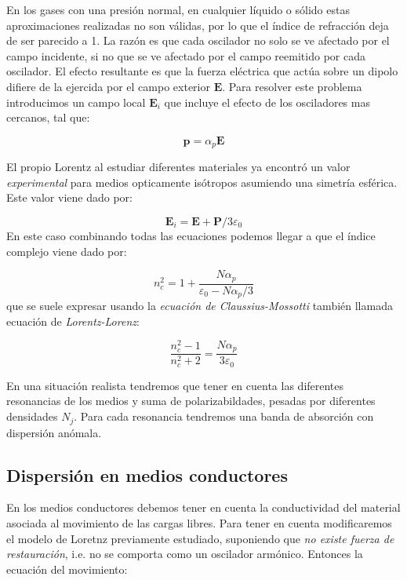 \documentclass[12pt]{article}
\newcommand{\En}{\mathbf{E}}
\newcommand{\Pn}{\mathbf{P}}
\newcommand{\pn}{\mathbf{p}}
\numberwithin{equation}{section}
\numberwithin{figure}{section}
\begin{document}
En los gases con una presión normal, en cualquier líquido o sólido estas aproximaciones realizadas no son válidas, por lo que el índice de refracción deja de ser parecido a 1. La razón es que cada oscilador no solo se ve afectado por el campo incidente, si no que se ve afectado por el campo reemitido por cada oscilador. El efecto resultante es que la fuerza eléctrica que actúa sobre un dipolo difiere de la ejercida por el campo exterior $\En$. Para resolver este problema introducimos un campo local $\En_i$ que incluye el efecto de los osciladores mas cercanos, tal que:

\begin{equation}
\pn = \alpha_p \En
\end{equation}

El propio Lorentz al estudiar diferentes materiales ya encontró un valor \textit{experimental} para medios opticamente isótropos asumiendo una simetría esférica. Este valor viene dado por:

\begin{equation}
\En_i = \En + \Pn /3 \varepsilon_0
\end{equation}
En este caso combinando todas las ecuaciones podemos llegar a  que el índice complejo viene dado por:

\begin{equation}
n_c^2 = 1 + \dfrac{N \alpha_p}{\varepsilon_0 - N \alpha_p/3}
\end{equation}
que se suele expresar usando la \textit{ecuación de Claussius-Mossotti} también llamada ecuación de \textit{Lorentz-Lorenz}:

\begin{equation}
\dfrac{n_c^2 - 1}{n_c^2 + 2} = \dfrac{N \alpha_p}{3 \varepsilon_0}
\end{equation}

En una situación realista tendremos que tener en cuenta las diferentes resonancias de los medios y suma de polarizabildades, pesadas por diferentes densidades $N_j$. Para cada resonancia tendremos una banda de absorción con dispersión anómala.

\subsection{Dispersión en medios conductores}

En los medios conductores debemos tener en cuenta la conductividad del material asociada al movimiento de las cargas libres. Para tener en cuenta modificaremos el modelo de Loretnz previamente estudiado, suponiendo que \textit{no existe fuerza de restauración}, i.e. no se comporta como un oscilador armónico. Entonces la ecuación del movimiento:
\end{document}

